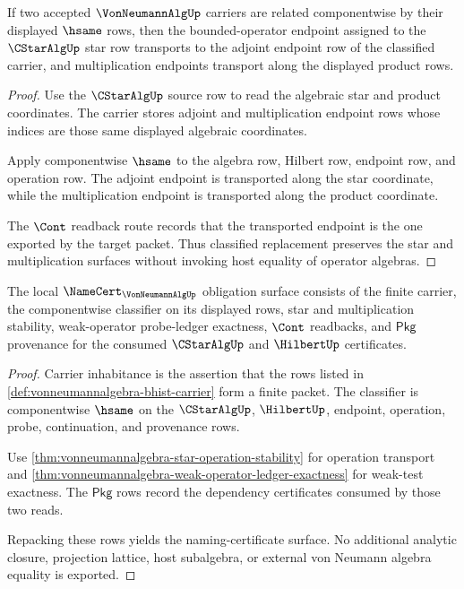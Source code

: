 \begin{theorem}\label{thm:vonneumannalgebra-star-operation-stability}
If two accepted $\VonNeumannAlgUp$ carriers are related componentwise by their displayed $\hsame$ rows, then the bounded-operator endpoint assigned to the $\CStarAlgUp$ star row transports to the adjoint endpoint row of the classified carrier, and multiplication endpoints transport along the displayed product rows.
\end{theorem}
\begin{proof}
Use the $\CStarAlgUp$ source row to read the algebraic star and product coordinates. The carrier stores adjoint and multiplication endpoint rows whose indices are those same displayed algebraic coordinates.

Apply componentwise $\hsame$ to the algebra row, Hilbert row, endpoint row, and operation row. The adjoint endpoint is transported along the star coordinate, while the multiplication endpoint is transported along the product coordinate.

The $\Cont$ readback route records that the transported endpoint is the one exported by the target packet. Thus classified replacement preserves the star and multiplication surfaces without invoking host equality of operator algebras.
\end{proof}

\begin{theorem}\label{thm:vonneumannalgebra-namecert-obligation-surface}
The local $\NameCert_{\VonNeumannAlgUp}$ obligation surface consists of the finite carrier, the componentwise classifier on its displayed rows, star and multiplication stability, weak-operator probe-ledger exactness, $\Cont$ readbacks, and $\mathsf{Pkg}$ provenance for the consumed $\CStarAlgUp$ and $\HilbertUp$ certificates.
\end{theorem}
\begin{proof}
Carrier inhabitance is the assertion that the rows listed in \autoref{def:vonneumannalgebra-bhist-carrier} form a finite packet. The classifier is componentwise $\hsame$ on the $\CStarAlgUp$, $\HilbertUp$, endpoint, operation, probe, continuation, and provenance rows.

Use \autoref{thm:vonneumannalgebra-star-operation-stability} for operation transport and \autoref{thm:vonneumannalgebra-weak-operator-ledger-exactness} for weak-test exactness. The $\mathsf{Pkg}$ rows record the dependency certificates consumed by those two reads.

Repacking these rows yields the naming-certificate surface. No additional analytic closure, projection lattice, host subalgebra, or external von Neumann algebra equality is exported.
\end{proof}

